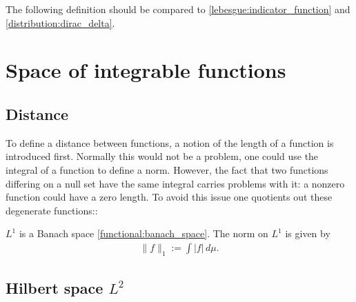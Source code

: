     The following definition should be compared to \ref{lebesgue:indicator_function} and \ref{distribution:dirac_delta}.

\section{Space of integrable functions}
\subsection{Distance}

    To define a distance between functions, a notion of the length of a function is introduced first. Normally this would not be a problem, one could use the integral of a function to define a norm. However, the fact that two functions differing on a null set have the same integral carries problems with it: a nonzero function could have a zero length. To avoid this issue one quotients out these degenerate functions::
    \begin{property}
        $L^1$ is a Banach space \ref{functional:banach_space}. The norm on $L^1$ is given by
        \begin{gather}
            \label{lebesgue:L1_norm}
            \|f\|_1 := \int|f|\,d\mu.
        \end{gather}
    \end{property}

\subsection{Hilbert space \texorpdfstring{$L^2$}{L2}}\label{section:hilbert_space}

